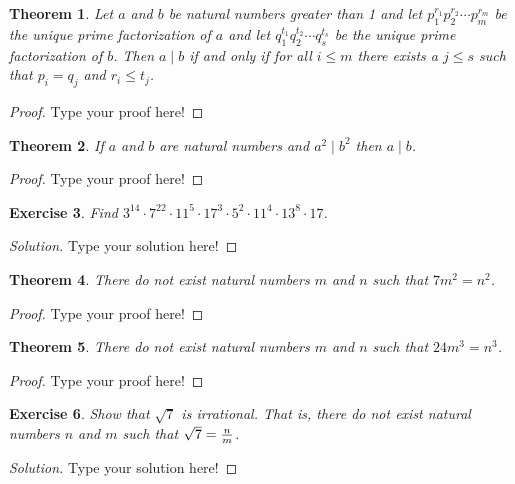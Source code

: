 \documentclass[12pt,leqno]{article}
\numberwithin{equation}{section}
\newtheorem{thm}{Theorem}[section]
\newtheorem{exer}[thm]{Exercise}
\theoremstyle{definition}
\begin{document}
\begin{thm}
Let $a$ and $b$ be natural numbers greater than 1 and let $p_1^{r_1}p_2^{r_2}\cdots p_m^{r_m}$ be the unique prime factorization of $a$ and let $q_1^{t_1}q_2^{t_2}\cdots q_s^{t_s}$ be the unique prime factorization of $b$.  Then $a \mid b$ if and only if for all $i \leq m$ there exists a $j\leq s$ such that $p_i = q_j$ and $r_i \leq t_j$.
\end{thm}

\begin{proof}[Proof]
Type your proof here!
\end{proof}


\begin{thm}
If $a$ and $b$ are natural numbers and $a^2 \mid b^2$ then $a \mid b$.
\end{thm}

\begin{proof}[Proof]
Type your proof here!
\end{proof}


\begin{exer}
Find $3^14 \cdot 7^22 \cdot 11^5 \cdot 17^3 \cdot 5^2 \cdot 11^4 \cdot 13^8 \cdot 17$.
\end{exer}

\begin{proof}[Solution]
Type your solution here!
\end{proof}

\setcounter{thm}{18}


\begin{thm}
There do not exist natural numbers $m$ and $n$ such that $7m^2 = n^2$.
\end{thm}

\begin{proof}[Proof]
Type your proof here!
\end{proof}


\begin{thm}
There do not exist natural numbers $m$ and $n$ such that $24m^3 = n^3$.
\end{thm}

\begin{proof}[Proof]
Type your proof here!
\end{proof}


\begin{exer}
Show that $\sqrt{7}$ is irrational.  That is, there do not exist natural numbers $n$ and $m$ such that $\sqrt{7} = {n \over m}$.
\end{exer}

\begin{proof}[Solution]
Type your solution here!
\end{proof}
\end{document}
